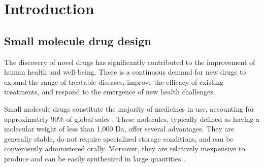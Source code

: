 \chapter{Introduction\label{chap:introduction}}

\section{Small molecule drug design\label{sec:drug-design}}

The discovery of novel drugs has significantly contributed to the improvement of human health and
well-being. There is a continuous demand for new drugs to expand the range of treatable diseases,
improve the efficacy of existing treatments, and respond to the emergence of new health challenges.

Small molecule drugs constitute the majority of medicines in use, accounting for approximately 90\%
of global sales \citep{makurvetBiologicsVsSmall2021}. These molecules, typically defined as having a
molecular weight of less than 1,000 Da, offer several advantages. They are generally stable, do not
require specialized storage conditions, and can be conveniently administered orally. Moreover, they
are relatively inexpensive to produce and can be easily synthesized in large quantities
\citep{southeyIntroductionSmallMolecule2023}.

